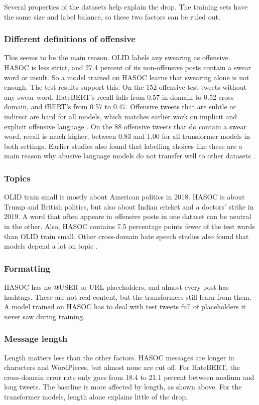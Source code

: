 \documentclass[11pt,a4paper]{article}
\begin{document}
Several properties of the datasets help explain the drop. The training sets have the same size and label balance, so these two factors can be ruled out.

\subsubsection*{Different definitions of offensive}
This seems to be the main reason. OLID labels any swearing as offensive. HASOC is less strict, and 27.4 percent of its non-offensive posts contain a swear word or insult. So a model trained on HASOC learns that swearing alone is not enough. The test results support this. On the 152 offensive test tweets without any swear word, HateBERT's recall falls from 0.57 in-domain to 0.52 cross-domain, and fBERT's from 0.57 to 0.47. Offensive tweets that are subtle or indirect are hard for all models, which matches earlier work on implicit and explicit offensive language \citep{caselli2020feel}. On the 88 offensive tweets that do contain a swear word, recall is much higher, between 0.83 and 1.00 for all transformer models in both settings. Earlier studies also found that labelling choices like these are a main reason why abusive language models do not transfer well to other datasets \citep{wiegand2019detection,fortuna2021how}.

\subsubsection*{Topics}
OLID train small is mostly about American politics in 2018. HASOC is about Trump and British politics, but also about Indian cricket and a doctors' strike in 2019. A word that often appears in offensive posts in one dataset can be neutral in the other. Also, HASOC contains 7.5 percentage points fewer of the test words than OLID train small. Other cross-domain hate speech studies also found that models depend a lot on topic \citep{markov2021exploring}.

\subsubsection*{Formatting}
HASOC has no @USER or URL placeholders, and almost every post has hashtags. These are not real content, but the transformers still learn from them. A model trained on HASOC has to deal with test tweets full of placeholders it never saw during training.

\subsubsection*{Message length}
Length matters less than the other factors. HASOC messages are longer in characters and WordPieces, but almost none are cut off. For HateBERT, the cross-domain error rate only goes from 18.4 to 21.1 percent between medium and long tweets. The baseline is more affected by length, as shown above. For the transformer models, length alone explains little of the drop.
\end{document}
